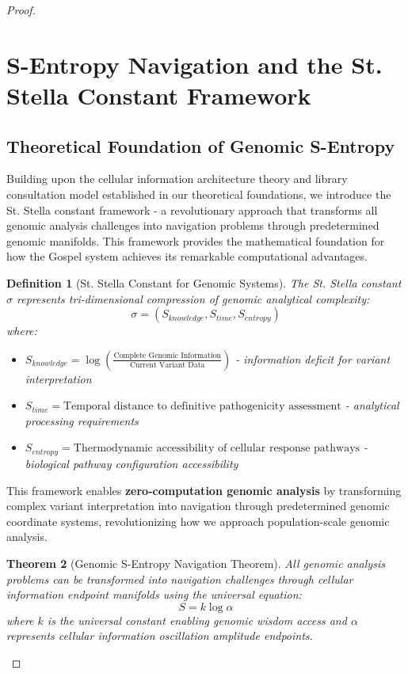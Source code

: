 \documentclass[12pt,a4paper]{article}
\newtheorem{theorem}{Theorem}[section]
\newtheorem{definition}[theorem]{Definition}
\begin{document}
\begin{proof}
\section{S-Entropy Navigation and the St. Stella Constant Framework}

\subsection{Theoretical Foundation of Genomic S-Entropy}

Building upon the cellular information architecture theory and library consultation model established in our theoretical foundations, we introduce the St. Stella constant framework - a revolutionary approach that transforms all genomic analysis challenges into navigation problems through predetermined genomic manifolds. This framework provides the mathematical foundation for how the Gospel system achieves its remarkable computational advantages.

\begin{definition}[St. Stella Constant for Genomic Systems]
The St. Stella constant $\sigma$ represents tri-dimensional compression of genomic analytical complexity:
$$\sigma = (S_{knowledge}, S_{time}, S_{entropy})$$
where:
\begin{itemize}
\item $S_{knowledge} = \log\left(\frac{\text{Complete Genomic Information}}{\text{Current Variant Data}}\right)$ - information deficit for variant interpretation
\item $S_{time} = \text{Temporal distance to definitive pathogenicity assessment}$ - analytical processing requirements  
\item $S_{entropy} = \text{Thermodynamic accessibility of cellular response pathways}$ - biological pathway configuration accessibility
\end{itemize}
\end{definition}

This framework enables \textbf{zero-computation genomic analysis} by transforming complex variant interpretation into navigation through predetermined genomic coordinate systems, revolutionizing how we approach population-scale genomic analysis.

\begin{theorem}[Genomic S-Entropy Navigation Theorem]
All genomic analysis problems can be transformed into navigation challenges through cellular information endpoint manifolds using the universal equation:
$$S = k \log \alpha$$
where $k$ is the universal constant enabling genomic wisdom access and $\alpha$ represents cellular information oscillation amplitude endpoints.
\end{theorem}


\end{proof}
\end{document}
